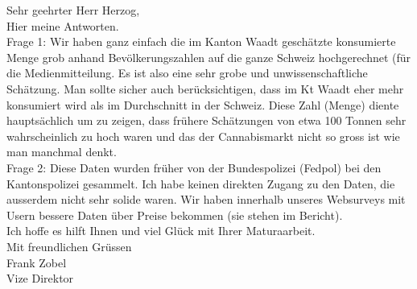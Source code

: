\documentclass[../main.tex]{subfiles}
\begin{document}
	\begin{tcolorbox}[title=Frank Zobel zu Thomas Herzog]
		Sehr geehrter Herr Herzog,\\

Hier meine Antworten.\\

Frage 1: Wir haben ganz einfach die im Kanton Waadt geschätzte konsumierte Menge grob anhand Bevölkerungszahlen auf die ganze Schweiz hochgerechnet (für die Medienmitteilung. Es ist also eine sehr grobe und unwissenschaftliche Schätzung. Man sollte sicher auch berücksichtigen, dass im Kt Waadt eher mehr konsumiert wird als im Durchschnitt in der Schweiz. Diese Zahl (Menge) diente hauptsächlich um zu zeigen, dass frühere Schätzungen von etwa 100 Tonnen sehr wahrscheinlich zu hoch waren und das der Cannabismarkt nicht so gross ist wie man manchmal denkt.\\

Frage 2: Diese Daten wurden früher von der Bundespolizei (Fedpol) bei den Kantonspolizei gesammelt. Ich habe keinen direkten Zugang zu den Daten, die ausserdem nicht sehr solide waren. Wir haben innerhalb unseres Websurveys mit Usern bessere Daten über Preise bekommen (sie stehen im Bericht).\\

Ich hoffe es hilft Ihnen und viel Glück mit Ihrer Maturaarbeit.\\

Mit freundlichen Grüssen\\

Frank Zobel\\
Vize Direktor
	\end{tcolorbox}
\end{document}
